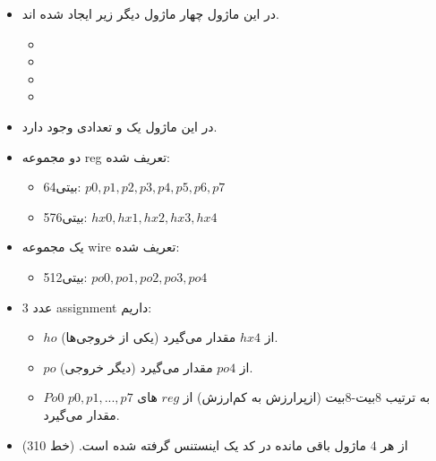\begin{itemize}
\item
در این ماژول چهار ماژول دیگر زیر ایجاد شده اند. 
\begin{itemize}
\item
{}
\item
{}
\item
{}
\item
{}
\end{itemize}
\item
در این ماژول یک 
و تعدادی 
وجود دارد.
\item
دو مجموعه reg تعریف شده:
\begin{itemize}
\item
64بیتی: $p0, p1, p2, p3, p4, p5, p6, p7$
\item
576بیتی: $hx0, hx1, hx2, hx3, hx4$
\end{itemize}
\item
یک مجموعه wire تعریف شده:
\begin{itemize}
\item
512بیتی: $po0, po1, po2, po3, po4$
\end{itemize}
\item
3 عدد assignment داریم:
\begin{itemize}
\item
 $ho$ (یکی از خروجی‌ها) از $hx4$ مقدار می‌گیرد. 
 \item
$po$ (دیگر خروجی) از $po4$ مقدار می‌گیرد. 
\item
$Po0$ به ترتیب 8بیت-8بیت (ازپرارزش به کم‌ارزش) از $reg$ های $p0, p1, ..., p7$ مقدار می‌گیرد.
\end{itemize}
\item
از هر 4 ماژول باقی مانده
 در کد یک اینستنس گرفته شده است. (خط 310)
 

\end{itemize}
